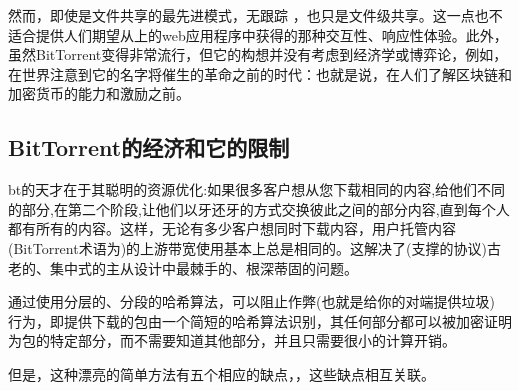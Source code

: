然而，即使是文件共享的最先进模式，无跟踪 \cite{pouwelse2005bittorrent}，也只是文件级共享。这一点也不适合提供人们期望从上的web应用程序中获得的那种交互性、响应性体验。此外，虽然BitTorrent变得非常流行，但它的构想并没有考虑到经济学或博弈论，例如，在世界注意到它的名字将催生的革命之前的时代：也就是说，在人们了解区块链和加密货币的能力和激励之前。\subsection{BitTorrent的经济和它的限制}

bt的天才在于其聪明的资源优化\cite{cohen2003incentives}:如果很多客户想从您下载相同的内容,给他们不同的部分,在第二个阶段,让他们以牙还牙的方式交换彼此之间的部分内容,直到每个人都有所有的内容。这样，无论有多少客户想同时下载内容，用户托管内容(BitTorrent术语为)的上游带宽使用基本上总是相同的。这解决了(支撑的协议)古老的、集中式的主从设计中最棘手的、根深蒂固的问题。

通过使用分层的、分段的哈希算法，可以阻止作弊(也就是给你的对端提供垃圾) 行为，即提供下载的包由一个简短的哈希算法识别，其任何部分都可以被加密证明为包的特定部分，而不需要知道其他部分，并且只需要很小的计算开销。

但是，这种漂亮的简单方法有五个相应的缺点，\cite{locher2006free,piatek2007incentives}，这些缺点相互关联。

